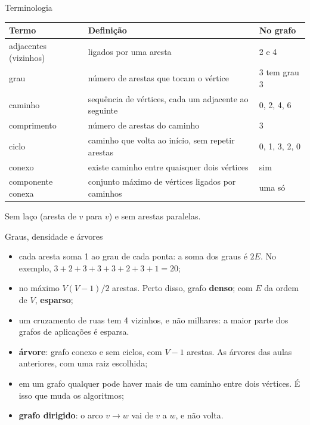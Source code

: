 \documentclass{beamer}
\begin{document}
\begin{frame}{Terminologia}
	\footnotesize
	\begin{tabular}{p{3.2cm}p{4.2cm}p{2.4cm}}
		\toprule
		Termo & Definição & No grafo \\
		\midrule
		adjacentes (vizinhos) & ligados por uma aresta & 2 e 4 \\
		grau & número de arestas que tocam o vértice & 3 tem grau 3 \\
		caminho & sequência de vértices, cada um adjacente ao seguinte & 0, 2, 4, 6 \\
		comprimento & número de arestas do caminho & 3 \\
		ciclo & caminho que volta ao início, sem repetir arestas & 0, 1, 3, 2, 0 \\
		conexo & existe caminho entre quaisquer dois vértices & sim \\
		componente conexa & conjunto máximo de vértices ligados por caminhos & uma só \\
		\bottomrule
	\end{tabular}

	\vspace{0.3cm}
	Sem laço (aresta de $v$ para $v$) e sem arestas paralelas.
\end{frame}

\begin{frame}{Graus, densidade e árvores}
	\begin{itemize}
		\item cada aresta soma 1 ao grau de cada ponta: a soma dos graus é
		      $2E$. No exemplo, $3+2+3+3+3+2+3+1 = 20$;
		\item no máximo $V(V-1)/2$ arestas. Perto disso, grafo \textbf{denso};
		      com $E$ da ordem de $V$, \textbf{esparso};
		\item um cruzamento de ruas tem 4 vizinhos, e não milhares: a maior parte
		      dos grafos de aplicações é esparsa.
	\end{itemize}

	\vspace{0.2cm}
	\begin{itemize}
		\item \textbf{árvore}: grafo conexo e sem ciclos, com $V - 1$ arestas.
		      As árvores das aulas anteriores, com uma raiz escolhida;
		\item em um grafo qualquer pode haver mais de um caminho entre dois
		      vértices. É isso que muda os algoritmos;
		\item \textbf{grafo dirigido}: o arco $v \to w$ vai de $v$ a $w$, e não
		      volta.
	\end{itemize}
\end{frame}
\end{document}

